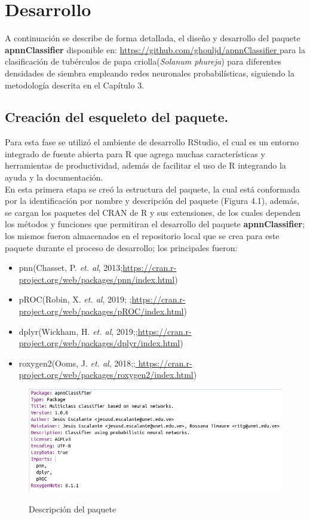 \chapter{Desarrollo}

	A continuaci\'on se describe de forma detallada, el diseño y desarrollo del paquete \textbf{apnnClassifier} disponible en: \url{ https://github.com/ghouljd/apnnClassifier } para la clasificaci\'on de tub\'erculos de papa criolla(\textit{Solanum phureja}) para diferentes densidades de siembra empleando redes neuronales probabil\'isticas, siguiendo la metodolog\'ia descrita en el Cap\'itulo 3.
	
\section{Creación del esqueleto del paquete.}
	
	Para esta fase se utilizó el ambiente de desarrollo RStudio, el cual es un entorno integrado de fuente abierta para R que agrega muchas caracter\'isticas y herramientas de productividad, además de facilitar el uso de R integrando la ayuda y la documentación.\\

En esta primera etapa se creó la estructura del paquete, la cual está conformada por la identificación por nombre y descripción del paquete (Figura 4.1), además, se cargan los paquetes del CRAN de R y sus extensiones, de los cuales dependen los métodos y funciones que permitiran el desarrollo del paquete \textbf{apnnClassifier}; los mismos fueron almacenados en el repositorio local que se crea para este paquete durante el proceso de desarrollo; los principales fueron:\\

\begin{itemize}
\item pnn(Chasset, P. \textit{et. al}, 2013;\url{https://cran.r-project.org/web/packages/pnn/index.html})
\item pROC(Robin, X. \textit{et. al}, 2019; ;\url{https://cran.r-project.org/web/packages/pROC/index.html})
\item dplyr(Wickham, H. \textit{et. al}, 2019;;\url{https://cran.r-project.org/web/packages/dplyr/index.html})
\item roxygen2(Ooms, J. \textit{et. al}, 2018;;\url{ https://cran.r-project.org/web/packages/roxygen2/index.html})
\end{itemize}

\begin{figure}[h!]
	\caption{Descripción del paquete}
	\centering
	\includegraphics[scale=0.6]{package-description.png}
	\label{fig2:arch}
\end{figure}

